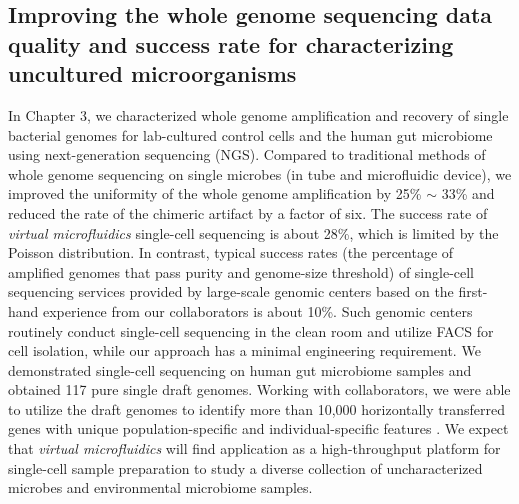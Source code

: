 \subsection{Improving the whole genome sequencing data quality and success rate for characterizing uncultured microorganisms}
In Chapter 3, we characterized whole genome amplification and recovery of single bacterial genomes for lab-cultured control cells and the human gut microbiome using next-generation sequencing (NGS). Compared to traditional methods of whole genome sequencing on single microbes (in tube and microfluidic device), we improved the uniformity of the whole genome amplification by 25\% $\sim$ 33\% and reduced the rate of the chimeric artifact by a factor of six. The success rate of \textit{virtual microfluidics} single-cell sequencing is about 28\%, which is limited by the Poisson distribution. In contrast, typical success rates (the percentage of amplified genomes that pass purity and genome-size threshold) of single-cell sequencing services provided by large-scale genomic centers based on the first-hand experience from our collaborators is about 10\%. Such genomic centers routinely conduct single-cell sequencing in the clean room and utilize FACS for cell isolation, while our approach has a minimal engineering requirement. We demonstrated single-cell sequencing on human gut microbiome samples and obtained 117 pure single draft genomes. Working with collaborators, we were able to utilize the draft genomes to identify more than 10,000 horizontally transferred genes with unique population-specific and individual-specific features \cite{Brito:2016cd}. We expect that \textit{virtual microfluidics} will find application as a high-throughput platform for single-cell sample preparation to study a diverse collection of uncharacterized microbes and environmental microbiome samples. 

